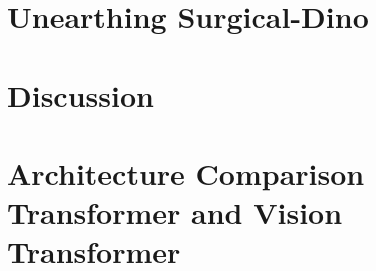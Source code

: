 \documentclass[12pt, twoside]{report_bachelorarbeit}
\begin{document}
\chapter{Unearthing Surgical-Dino}

\chapter{Discussion}

% 
\clearpage
\pagestyle{plain}
\printbibliography

\appendix
\chapter{Architecture Comparison Transformer and Vision Transformer}\label{app:CompViT}


\newpage
%
\end{document}
